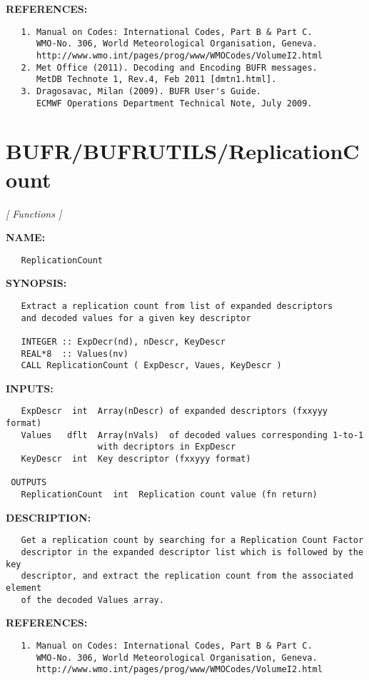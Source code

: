\textbf{REFERENCES:}\hspace{0.08in}\begin{Verbatim}
   1. Manual on Codes: International Codes, Part B & Part C.
      WMO-No. 306, World Meteorological Organisation, Geneva.
      http://www.wmo.int/pages/prog/www/WMOCodes/VolumeI2.html
   2. Met Office (2011). Decoding and Encoding BUFR messages.
      MetDB Technote 1, Rev.4, Feb 2011 [dmtn1.html].
   3. Dragosavac, Milan (2009). BUFR User's Guide.
      ECMWF Operations Department Technical Note, July 2009.
\end{Verbatim}
\section{BUFR/BUFRUTILS/ReplicationCount}
\textsl{[ Functions ]}

\label{ch:robo7}
\label{ch:BUFR_BUFRUTILS_ReplicationCount}
\textbf{NAME:}\hspace{0.08in}\begin{Verbatim}
   ReplicationCount
\end{Verbatim}
\textbf{SYNOPSIS:}\hspace{0.08in}\begin{Verbatim}
   Extract a replication count from list of expanded descriptors
   and decoded values for a given key descriptor

   INTEGER :: ExpDecr(nd), nDescr, KeyDescr
   REAL*8  :: Values(nv)
   CALL ReplicationCount ( ExpDescr, Vaues, KeyDescr )
\end{Verbatim}
\textbf{INPUTS:}\hspace{0.08in}\begin{Verbatim}
   ExpDescr  int  Array(nDescr) of expanded descriptors (fxxyyy format)
   Values   dflt  Array(nVals)  of decoded values corresponding 1-to-1
                  with decriptors in ExpDescr
   KeyDescr  int  Key descriptor (fxxyyy format)

 OUTPUTS
   ReplicationCount  int  Replication count value (fn return)
\end{Verbatim}
\textbf{DESCRIPTION:}\hspace{0.08in}\begin{Verbatim}
   Get a replication count by searching for a Replication Count Factor
   descriptor in the expanded descriptor list which is followed by the key
   descriptor, and extract the replication count from the associated element
   of the decoded Values array.
\end{Verbatim}
\textbf{REFERENCES:}\hspace{0.08in}\begin{Verbatim}
   1. Manual on Codes: International Codes, Part B & Part C.
      WMO-No. 306, World Meteorological Organisation, Geneva.
      http://www.wmo.int/pages/prog/www/WMOCodes/VolumeI2.html
\end{Verbatim}
